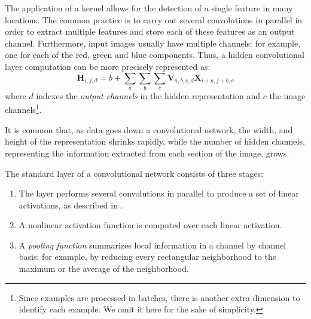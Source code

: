 The application of a kernel allows for the detection of a single feature in many locations. The common practice is to carry out several convolutions in parallel in order to extract multiple features and store each of these features as an output channel. Furthermore, input images usually have multiple channels: for example, one for each of the red, green and blue components. Thus, a hidden convolutional layer computation can be more precisely represented as:
\begin{equation} \label{eq:convolution2}
\mathbf{H}_{i, j, d} = b + \sum_a \sum_b \sum_c \mathbf{V}_{a,b,c,d} \mathbf{X}_{i + a, j + b, c}
\end{equation}
where \( d \) indexes the \textit{output channels} in the hidden representation and \( c \) the image channels\footnote{Since examples are processed in batches, there is another extra dimension to identify each example. We omit it here for the sake of simplicity.}. 

It is common that, as data goes down a convolutional network, the width, and height of the representation shrinks rapidly, while the number of hidden channels, representing the information extracted from each section of the image, grows.

The standard layer of a convolutional network consists of three stages:
\begin{enumerate}
    \item The layer performs several convolutions in parallel to produce a set of linear activations, as described in .
    \item A nonlinear activation function is computed over each linear activation.
    \item A \textit{pooling function} summarizes local information in a channel by channel basis: for example, by reducing every rectangular neighborhood to the maximum or the average of the neighborhood.
\end{enumerate}

